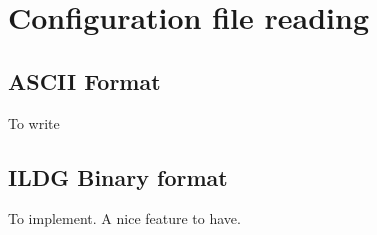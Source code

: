 \documentclass[a4paper,10pt]{book}
\begin{document}
\section{Configuration file reading}

\subsection{ASCII Format}
To write

\subsection{ILDG Binary format}
To implement. A nice feature to have.


  
  
  
\end{document}
